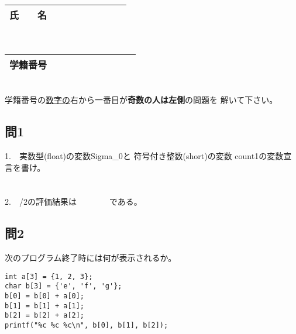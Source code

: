 \documentclass[a4j]{jarticle}
\def\ds{\displaystyle}
\begin{document}
\thispagestyle{empty}

\begin{multicols*}{2}%


\def\subst#1#2{$\ds #1$
 \ $\longrightarrow$\ 
 \underline{\hbox to 5cm{\ttfamily #2}}}



\noindent
\begin{tabular}[t]{|c|cccccccc|}\hline
氏　　名 & & & & & & & & \\ \hline
\end{tabular}\\
\begin{tabular}[t]{|c|c|c|c|c|c|c|c|c|c|}\hline
学籍番号 & & & & & & & & \\ \hline
\end{tabular}\\
学籍番号の\underline{数字の}右から一番目が{\bfseries 奇数の人は左側}の問題を
解いて下さい。
\vspace{-5ex}


\subsection*{問1}
%
%
%




1.　実数型({\ttfamily float})の変数{\ttfamily Sigma\_0}と
符号付き整数({\ttfamily short})の変数
{\ttfamily count1}の変数宣言を書け。\\
\\
\\


2.　{/2}の評価結果は　　　　である。





\subsection*{問2}

次のプログラム終了時には何が表示されるか。
\begin{verbatim}
int a[3] = {1, 2, 3};
char b[3] = {'e', 'f', 'g'};
b[0] = b[0] + a[0];
b[1] = b[1] + a[1];
b[2] = b[2] + a[2];
printf("%c %c %c\n", b[0], b[1], b[2]);
\end{verbatim}


\end{multicols*}
\end{document}
